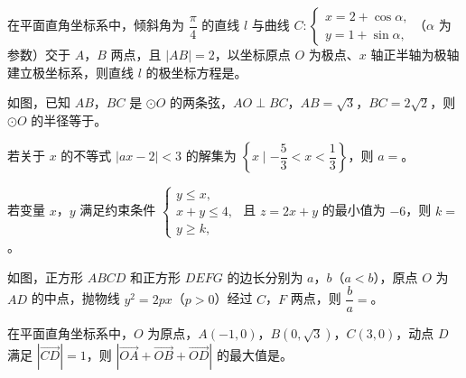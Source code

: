 \begin{question}
在平面直角坐标系中，倾斜角为 $\dfrac\pi4$ 的直线 $l$ 与曲线 $C:\begin{cases}x=2+\cos\alpha,\\y=1+\sin\alpha,\end{cases}$（$\alpha$ 为参数）交于 $A$，$B$ 两点，且 $|AB|=2$，以坐标原点 $O$ 为极点、$x$ 轴正半轴为极轴建立极坐标系，则直线 $l$ 的极坐标方程是\gkblank{}。

\Needspace{0.4\textheight}
\end{question}
\begin{question}
如图，已知 $AB$，$BC$ 是 $\odot O$ 的两条弦，$AO\perp BC$，$AB=\sqrt3$，$BC=2\sqrt2$，则 $\odot O$ 的半径等于\gkblank{}。
\nopagebreak[4]
\begin{center}\end{center}
\nopagebreak[4]
\end{question}
\begin{question}
若关于 $x$ 的不等式 $|ax-2|<3$ 的解集为 $\left\{x\mid-\dfrac53<x<\dfrac13\right\}$，则 $a=$\gkblank{}。

\end{question}
\begin{question}
若变量 $x$，$y$ 满足约束条件 $\begin{cases}y\leqslant x,\\x+y\leqslant4,\\y\geqslant k,\end{cases}$ 且 $z=2x+y$ 的最小值为 $-6$，则 $k=$\gkblank{}。

\Needspace{0.4\textheight}
\end{question}
\begin{question}
如图，正方形 $ABCD$ 和正方形 $DEFG$ 的边长分别为 $a$，$b$（$a<b$），原点 $O$ 为 $AD$ 的中点，抛物线 $y^2=2px$（$p>0$）经过 $C$，$F$ 两点，则 $\dfrac ba=$\gkblank{}。
\nopagebreak[4]
\begin{center}\end{center}
\nopagebreak[4]
\end{question}
\begin{question}
在平面直角坐标系中，$O$ 为原点，$A(-1,0)$，$B(0,\sqrt3)$，$C(3,0)$，动点 $D$ 满足 $|\overrightarrow{CD}|=1$，则 $|\overrightarrow{OA}+\overrightarrow{OB}+\overrightarrow{OD}|$ 的最大值是\gkblank{}。

\end{question}

